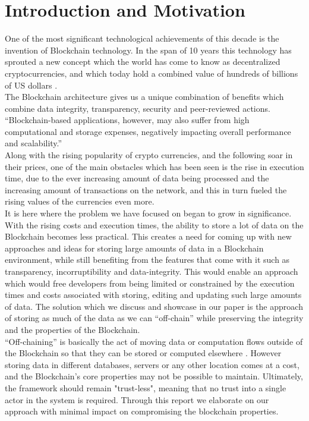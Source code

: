 \section{Introduction and Motivation}

One of the most significant technological achievements of this decade is the invention of Blockchain technology. In the span of 10 years this technology has sprouted a new concept which the world has come to know as decentralized cryptocurrencies, and which today hold a combined value of hundreds of billions of US dollars \cite{relatedWork40}. \\

The Blockchain architecture gives us a unique combination of benefits which combine data integrity, transparency, security and peer-reviewed actions. 
“Blockchain-based applications, however, may also suffer from high computational and storage expenses, negatively impacting overall performance and scalability.” \cite{Eberhardt2017}\\

Along with the rising popularity of crypto currencies, and the following soar in their prices, one of the main obstacles which has been seen is the rise in execution time, due to the ever increasing amount of data being processed and the increasing amount of transactions on the network, and this in turn fueled the rising values of the currencies even more.  \\

It is here where the problem we have focused on began to grow in significance. With the rising costs and execution times, the ability to store a lot of data on the Blockchain becomes less practical. This creates a need for coming up with new approaches and ideas for storing large amounts of data in a Blockchain environment, while still benefiting from the features that come with it such as transparency, incorruptibility and data-integrity. This would enable an approach which would free developers from being limited or constrained by the execution times and costs associated with storing, editing and updating such large amounts of data. The solution which we discuss and showcase in our paper is the approach of storing as much of the data as we can “off-chain” while preserving the integrity and the properties of the Blockchain.\\

“Off-chaining” is basically the act of moving data or computation flows outside of the Blockchain so that they can be stored or computed elsewhere \cite{Eberhardt2017}. However storing data in different databases, servers or any other location comes at a cost, and the Blockchain’s core properties may not be possible to maintain. Ultimately, the framework should remain "trust-less", meaning that no trust into a single actor in the system is required. Through this report we elaborate on our approach with minimal impact on compromising the blockchain properties.\\

